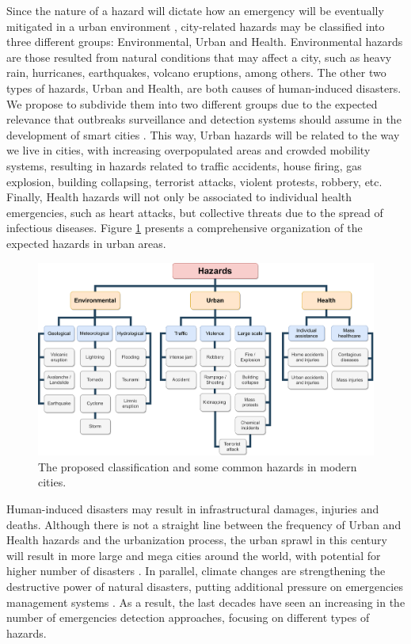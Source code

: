 \begin{refsection}
Since the nature of a hazard will dictate how an emergency will be eventually mitigated in a urban environment \cite{citiesdisasters1,hazard2,hazard4}, city-related hazards may be classified into three different groups: Environmental, Urban and Health. Environmental hazards are those resulted from natural conditions that may affect a city, such as heavy rain, hurricanes, earthquakes, volcano eruptions, among others. The other two types of hazards, Urban and Health, are both causes of human-induced disasters. We propose to subdivide them into two different groups due to the expected relevance that outbreaks surveillance and detection systems should assume in the development of smart cities \cite{covidsmartcities1,covidsmartcities2,enviroment3}. This way, Urban hazards will be related to the way we live in cities, with increasing overpopulated areas and crowded mobility systems, resulting in hazards related to traffic accidents, house firing, gas explosion, building collapsing, terrorist attacks, violent protests, robbery, etc. Finally, Health hazards will not only be associated to individual health emergencies, such as heart attacks, but collective threats due to the spread of infectious diseases. Figure \ref{Fig:hazards} presents a comprehensive organization of the expected hazards in urban areas. 

\begin{figure}[htbp]
  \centering
  \includegraphics[width=\linewidth]{Chapters/1-Survey/images/Hazards.pdf}
  \caption{The proposed classification and some common hazards in modern cities.}\label{Fig:hazards}
\end{figure}

Human-induced disasters may result in infrastructural damages, injuries and deaths. Although there is not a straight line between the frequency of Urban and Health hazards and the urbanization process, the urban sprawl in this century will result in more large and mega cities around the world, with potential for higher number of disasters \cite{urbansprawl1,urbansprawl2}. In parallel, climate changes are strengthening the destructive power of natural disasters, putting additional pressure on emergencies management systems \cite{enviroment1,enviroment2}. As a result, the last decades have seen an increasing in the number of emergencies detection approaches, focusing on different types of hazards. 


\end{refsection}
